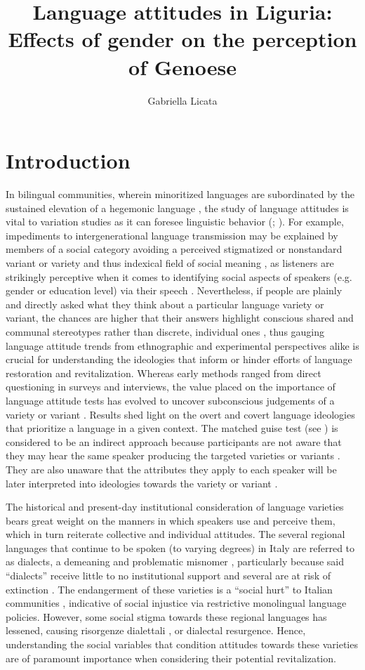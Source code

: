 \documentclass[output=paper,colorlinks,citecolor=brown]{langscibook}
\author{Gabriella Licata \affiliation{University of California, Berkeley}}
\title{Language attitudes in Liguria: Effects of gender on the perception of Genoese}
\begin{document}
\maketitle

\section{Introduction}

In bilingual communities, wherein minoritized languages are subordinated by the sustained elevation of a hegemonic language \citep{lipp97}, the study of language attitudes is vital to variation studies as it can foresee linguistic behavior (\cite{coop77}; \cite{garr03}). For example, impediments to intergenerational language transmission may be explained by members of a social category avoiding a perceived stigmatized or nonstandard variant or variety and thus indexical field of social meaning \citep{ecke08}, as listeners are strikingly perceptive when it comes to identifying social aspects of speakers (e.g. gender or education level) via their speech \citep{chap16}. Nevertheless, if people are plainly and directly asked what they think about a particular language variety or variant, the chances are higher that their answers highlight conscious shared and communal stereotypes rather than discrete, individual ones \citep{stef05}, thus gauging language attitude trends from ethnographic and experimental perspectives alike is crucial for understanding the ideologies that inform or hinder efforts of language restoration and revitalization. Whereas early methods ranged from direct questioning in surveys and interviews, the value placed on the importance of language attitude tests has evolved to uncover subconscious judgements of a variety or variant \citep{garr01}. Results shed light on the overt and covert language ideologies that prioritize a language in a given context. The matched guise test (see \cite{lamb66}) is considered to be an indirect approach because participants are not aware that they may hear the same speaker producing the targeted varieties or variants \cite{soli02}. They are also unaware that the attributes they apply to each speaker will be later interpreted into ideologies towards the variety or variant \citep{garr01}.
\par The historical and present-day institutional consideration of language varieties bears great weight on the manners in which speakers use and perceive them, which in turn reiterate collective and individual attitudes. The several regional languages that continue to be spoken (to varying degrees) in Italy are referred to as dialects, a demeaning and problematic misnomer \citep{fish91}, particularly because said “dialects” receive little to no institutional support and several are at risk of extinction \citep{colu09}. The endangerment of these varieties is a “social hurt” to Italian communities \citep{fish91}, indicative of social injustice via restrictive monolingual language policies. However, some social stigma towards these regional languages has lessened, causing risorgenze dialettali \citep{berr06}, or dialectal resurgence. Hence, understanding the social variables that condition attitudes towards these varieties are of paramount importance when considering their potential revitalization.
\end{document}
